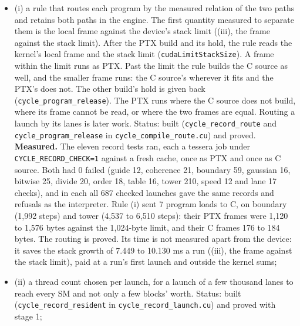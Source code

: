 \begin{enumerate}
\begin{itemize}
\begin{enumerate}
\begin{itemize}
\item (i) a rule that routes each program by the measured relation of the two paths and retains both paths in the engine. The first quantity measured to separate them is the local frame against the device's stack limit ((iii), the frame against the stack limit). After the PTX build and its hold, the rule reads the kernel's local frame and the stack limit (\texttt{cuda\allowbreak{}Limit\allowbreak{}Stack\allowbreak{}Size}). A frame within the limit runs as PTX. Past the limit the rule builds the C source as well, and the smaller frame runs: the C source's wherever it fits and the PTX's does not. The other build's hold is given back (\texttt{cycle\_\allowbreak{}program\_\allowbreak{}release}). The PTX runs where the C source does not build, where its frame cannot be read, or where the two frames are equal. Routing a launch by its lanes is later work. Status: built (\texttt{cycle\_\allowbreak{}record\_\allowbreak{}route} and \texttt{cycle\_\allowbreak{}program\_\allowbreak{}release} in \texttt{cycle\_\allowbreak{}compile\_\allowbreak{}route.\allowbreak{}cu}) and proved. \textbf{Measured.} The eleven record tests ran, each a tessera job under \texttt{CYCLE\_\allowbreak{}RECORD\_\allowbreak{}CHECK=1} against a fresh cache, once as PTX and once as C source. Both had 0 failed (guide 12, coherence 21, boundary 59, gaussian 16, bitwise 25, divide 20, order 18, table 16, tower 210, speed 12 and lane 17 checks), and in each all 687 checked launches gave the same records and refusals as the interpreter. Rule (i) sent 7 program loads to C, on boundary (1,992 steps) and tower (4,537 to 6,510 steps): their PTX frames were 1,120 to 1,576 bytes against the 1,024-byte limit, and their C frames 176 to 184 bytes. The routing is proved. Its time is not measured apart from the device: it saves the stack growth of 7.449 to 10.130 ms a run ((iii), the frame against the stack limit), paid at a run's first launch and outside the kernel sums;
\item (ii) a thread count chosen per launch, for a launch of a few thousand lanes to reach every SM and not only a few blocks' worth. Status: built (\texttt{cycle\_\allowbreak{}record\_\allowbreak{}resident} in \texttt{cycle\_\allowbreak{}record\_\allowbreak{}launch.\allowbreak{}cu}) and proved with stage 1;


\end{itemize}
\end{enumerate}
\end{itemize}
\end{enumerate}
